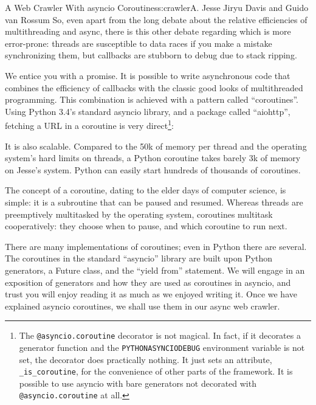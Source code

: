 \begin{aosachapter}{A Web Crawler With asyncio Coroutines}{s:crawler}{A. Jesse Jiryu Davis and Guido van Rossum}
So, even apart from the long debate about the relative efficiencies of
multithreading and async, there is this other debate regarding which is
more error-prone: threads are susceptible to data races if you make a
mistake synchronizing them, but callbacks are stubborn to debug due to
stack ripping.

\label{coroutines}

We entice you with a promise. It is possible to write asynchronous code
that combines the efficiency of callbacks with the classic good looks of
multithreaded programming. This combination is achieved with a pattern
called ``coroutines''. Using Python 3.4's standard asyncio library, and
a package called ``aiohttp'', fetching a URL in a coroutine is very
direct\footnote{The \texttt{@asyncio.coroutine} decorator is not
  magical. In fact, if it decorates a generator function and the
  \texttt{PYTHONASYNCIODEBUG} environment variable is not set, the
  decorator does practically nothing. It just sets an attribute,
  \texttt{\_is\_coroutine}, for the convenience of other parts of the
  framework. It is possible to use asyncio with bare generators not
  decorated with \texttt{@asyncio.coroutine} at all.}:

\begin{Shaded}
\begin{Highlighting}[]
     
          
          
\end{Highlighting}
\end{Shaded}

It is also scalable. Compared to the 50k of memory per thread and the
operating system's hard limits on threads, a Python coroutine takes
barely 3k of memory on Jesse's system. Python can easily start hundreds
of thousands of coroutines.

The concept of a coroutine, dating to the elder days of computer
science, is simple: it is a subroutine that can be paused and resumed.
Whereas threads are preemptively multitasked by the operating system,
coroutines multitask cooperatively: they choose when to pause, and which
coroutine to run next.

There are many implementations of coroutines; even in Python there are
several. The coroutines in the standard ``asyncio'' library are built
upon Python generators, a Future class, and the ``yield from''
statement. We will engage in an exposition of generators and how they
are used as coroutines in asyncio, and trust you will enjoy reading it
as much as we enjoyed writing it. Once we have explained asyncio
coroutines, we shall use them in our async web crawler.


\end{aosachapter}
